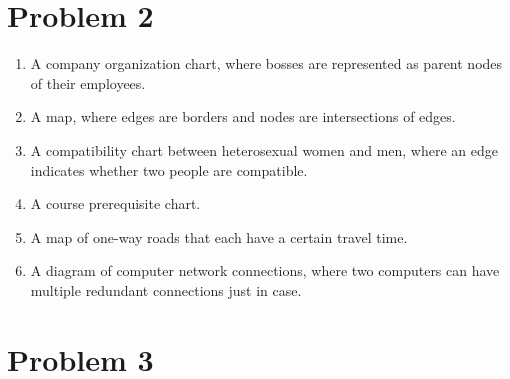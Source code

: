 \documentclass[12pt]{article}
\begin{document}
\section{Problem 2}

\begin{enumerate}
    \item A company organization chart, where bosses are represented as parent nodes of their employees.
    \item A map, where edges are borders and nodes are intersections of edges.
    \item A compatibility chart between heterosexual women and men, where an edge
          indicates whether two people are compatible.
    \item A course prerequisite chart.
    \item A map of one-way roads that each have a certain travel time.
    \item A diagram of computer network connections, where two computers
          can have multiple redundant connections just in case.
\end{enumerate}

\section{Problem 3}
\end{document}
